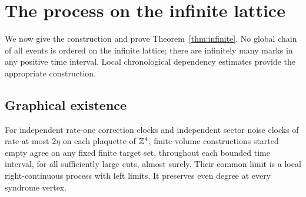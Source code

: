 \section{The process on the infinite lattice}\label{sec:infinite}

We now give the construction and prove
Theorem~\ref{thm:infinite}. No global chain of all events is ordered
on the infinite lattice; there are infinitely many marks in any
positive time interval. Local chronological dependency estimates
provide the appropriate construction.

\subsection{Graphical existence}

\begin{lemma}\label{lem:graphical}
For independent rate-one correction clocks and independent sector
noise clocks of rate at most \(2\eta\) on each plaquette of \(\mathbb Z^4\),
finite-volume constructions started empty agree on any fixed finite
target set, throughout each bounded time interval, for all sufficiently
large cuts, almost surely. Their common limit is a local
right-continuous process with left limits. It preserves even degree
at every syndrome vertex.
\end{lemma}
